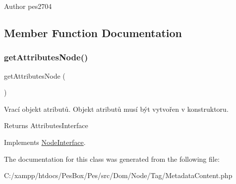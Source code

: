 \begin{DoxyAuthor}{Author}
pes2704 
\end{DoxyAuthor}


\subsection{Member Function Documentation}
\mbox{\label{class_pes_1_1_dom_1_1_node_1_1_tag_1_1_metadata_content_a4722e7722b245351681b05d35f6694f3}} 
\subsubsection{\texorpdfstring{get\+Attributes\+Node()}{getAttributesNode()}}
{\footnotesize\ttfamily get\+Attributes\+Node (\begin{DoxyParamCaption}{ }\end{DoxyParamCaption})}

Vrací objekt atributů. Objekt atributů musí být vytvořen v konstruktoru.

\begin{DoxyReturn}{Returns}
Attributes\+Interface 
\end{DoxyReturn}


Implements \mbox{\hyperlink{interface_pes_1_1_dom_1_1_node_1_1_node_interface_a4722e7722b245351681b05d35f6694f3}{Node\+Interface}}.



The documentation for this class was generated from the following file\+:\begin{DoxyCompactItemize}
\item 
C\+:/xampp/htdocs/\+Pes\+Box/\+Pes/src/\+Dom/\+Node/\+Tag/Metadata\+Content.\+php\end{DoxyCompactItemize}
